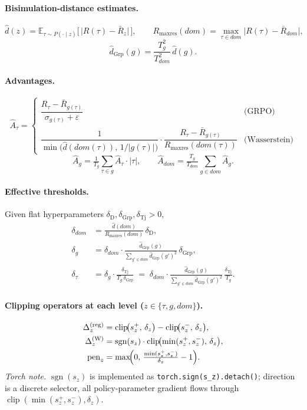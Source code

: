 \documentclass[11pt]{article}
\DeclareMathOperator*{\clip}{clip}
\DeclareMathOperator{\sign}{sgn}
\begin{document}
\paragraph{Bisimulation-distance estimates.}
\[
\hat d(z) = \mathbb E_{\tau\sim P(\cdot\mid z)}\bigl[\,\lvert R(\tau)-\bar R_z\rvert\,\bigr],\qquad
R_{\max\text{res}}(dom) = \max_{\tau\in dom}\lvert R(\tau)-\bar R_{dom}\rvert,
\]
\[
\hat d_{\operatorname{Grp}}(g) = \frac{T_g^{2}}{T_{dom}^{2}}\,\hat d(g).
\]

\paragraph{Advantages.}
\[
\hat A_\tau =
\begin{cases}
\dfrac{R_\tau - \bar R_{g(\tau)}}{\sigma_{g(\tau)}+\varepsilon}
  & \text{(GRPO)} \\[6pt]
\dfrac{1}{\min\!\bigl(\hat d(dom(\tau)),\,1/|g(\tau)|\bigr)}\cdot\dfrac{R_\tau - \bar R_{g(\tau)}}{R_{\max\text{res}}(dom(\tau))}
  & \text{(Wasserstein)}
\end{cases}
\]
\[
\hat A_g   = \tfrac{1}{T_g}\sum_{\tau\in g}\hat A_\tau\cdot|\tau|,\qquad
\hat A_{dom} = \tfrac{T_g}{T_{dom}}\sum_{g\in dom}\hat A_g.
\]

\paragraph{Effective thresholds.}
Given flat hyperparameters $\delta_{\text{D}},\delta_{\operatorname{Grp}},\delta_{\operatorname{Tj}}>0$,
\begin{align*}
\delta_{dom} &= \frac{\hat d(dom)}{R_{\max\text{res}}(dom)}\,\delta_{\text{D}}, \\
\delta_g     &= \delta_{dom}\cdot
                 \frac{\hat d_{\operatorname{Grp}}(g)}{\sum_{g'\in dom}\hat d_{\operatorname{Grp}}(g')^{2}}\,\delta_{\operatorname{Grp}}, \\
\delta_\tau  &= \delta_g\cdot\frac{\delta_{\operatorname{Tj}}}{T_g\,\delta_{\operatorname{Grp}}}
              \;=\; \delta_{dom}\cdot
                 \frac{\hat d_{\operatorname{Grp}}(g)}{\sum_{g'\in dom}\hat d_{\operatorname{Grp}}(g')^{2}}\,\frac{\delta_{\operatorname{Tj}}}{T_g}.
\end{align*}

\paragraph{Clipping operators at each level ($z\in\{\tau,g,dom\}$).}
\begin{align*}
\Delta_z^{(\mathrm{reg})}   &= \clip\!\bigl(s_z^{+},\,\delta_z\bigr) - \clip\!\bigl(s_z^{-},\,\delta_z\bigr), \\
\Delta_z^{(\mathrm{W})}     &= \sign(s_z)\cdot\clip\!\bigl(\min(s_z^{+},s_z^{-}),\,\delta_z\bigr), \\
\mathrm{pen}_z &= \max\!\Bigl(0,\,\tfrac{\min(s_z^{+},s_z^{-})}{\delta_z} - 1\Bigr).
\end{align*}
\emph{Torch note.} $\sign(s_z)$ is implemented as
\verb|torch.sign(s_z).detach()|; direction is a discrete selector, all
policy-parameter gradient flows through
$\clip(\min(s_z^+,s_z^-),\delta_z)$.
\end{document}
